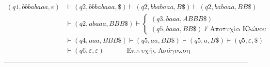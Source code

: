 \reducevspace\reducevspace\reducevspace


\begin{tcolorbox}[colback=yellow!15!white, colframe=blue!50!white,
	fonttitle=\bfseries\Large, title = {Υπολογισμός αποδοχής $bbbabaaa$}]
	\reducevspace\reducevspace\reducevspace\reducevspace\reducevspace\reducevspace\reducevspace\reducevspace
	\reducevspace\reducevspace\reducevspace\reducevspace\reducevspace\reducevspace\reducevspace\reducevspace
	\reducevspace\reducevspace\reducevspace\reducevspace\reducevspace\reducevspace\reducevspace\reducevspace
	\begin{adjustwidth}{-0.75em}{}
		\begin{equation*}
			\begin{aligned}
				(q1, bbbabaaa, \varepsilon)
				&\vdash (q2, bbbabaaa, \$) \vdash (q2, bbabaaa, Β\$) \vdash (q2, babaaa, BB\$) \\
				&\vdash (q2, abaaa, BBB\$) \vdash
				\left\{
				\begin{array}{l}
					(q3, baaa, ABBB\$) \\
					(q5, baaa, BB\$) \nvdash \text{Αποτυχία Κλώνου}
				\end{array}
				\right. \\
				&\vdash (q4, aaa, BBB\$) \vdash (q5, aa, BB\$) \vdash (q5, a, B\$) \vdash (q5, \varepsilon, \$)\\
				&\vdash (q6, \varepsilon, \varepsilon)\qquad\quad \text{ Επιτυχής Ανάγνωση}
			\end{aligned}
		\end{equation*}
	\end{adjustwidth}
\end{tcolorbox}
\reducevspace\reducevspace\reducevspace\reducevspace\reducevspace\reducevspace\reducevspace
\reducevspace\reducevspace\reducevspace\reducevspace\reducevspace\reducevspace\reducevspace
\begin{center}
	\noindent\rule{\linewidth}{0.5pt}
\end{center}
